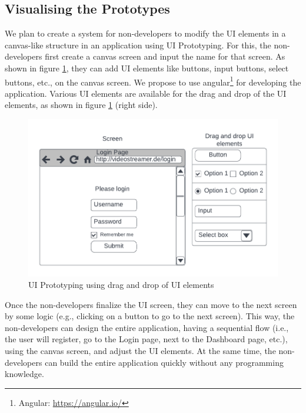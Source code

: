 \subsection{Visualising the Prototypes}
\label{solutionideas:subsection:visualize}

We plan to create a system for non-developers to modify the UI elements in a canvas-like structure in an application using UI Prototyping.
For this, the non-developers first create a canvas screen and input the name for that screen.
As shown in figure \ref{solutionideas:fig:uiprototyping}, they can add UI elements like buttons, input buttons, select buttons, etc., on the canvas screen.
We propose to use angular\footnote{Angular: \url{https://angular.io/}} for developing the application.
Various UI elements are available for the drag and drop of the UI elements, as shown in figure \ref{solutionideas:fig:uiprototyping} (right side).

\begin{figure}[h]
    \centering
    \includegraphics[scale=0.4]{images/solution-ideas/UIPrototyping.png}
    \caption{UI Prototyping using drag and drop of UI elements}
    \label{solutionideas:fig:uiprototyping}
\end{figure}

Once the non-developers finalize the UI screen, they can move to the next screen by some logic (e.g., clicking on a button to go to the next screen). 
This way, the non-developers can design the entire application, having a sequential flow (i.e., the user will register, go to the Login page, next to the Dashboard page, etc.), using the canvas screen, and adjust the UI elements.
At the same time, the non-developers can build the entire application quickly without any programming knowledge.

